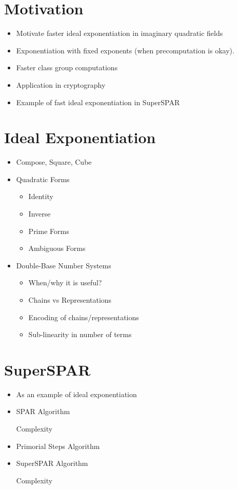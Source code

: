 \documentclass[11pt, letterpaper]{article}
\theoremstyle{definition}
\begin{document}
\section{Motivation}
\begin{itemize}
\item Motivate faster ideal exponentiation in imaginary quadratic fields
\item Exponentiation with fixed exponents (when precomputation is okay).
\item Faster class group computations
\item Application in cryptography
\item Example of fast ideal exponentiation in SuperSPAR
\end{itemize}


\section{Ideal Exponentiation}
\begin{itemize}
\item Compose, Square, Cube

\item Quadratic Forms
	\begin{itemize}
	\item Identity
	\item Inverse
	\item Prime Forms
	\item Ambiguous Forms
	\end{itemize}
	

\item Double-Base Number Systems
	\begin{itemize}
	\item When/why it is useful?
	\item Chains vs Representations
	\item Encoding of chains/representations
	\item Sub-linearity in number of terms
	\end{itemize}
	
	
\end{itemize}

\bigbreak
\section{SuperSPAR}
\begin{itemize}
\item As an example of ideal exponentiation
\item SPAR Algorithm
	\begin{itemize}
		Complexity
	\end{itemize}
\item Primorial Steps Algorithm
\item SuperSPAR Algorithm
	\begin{itemize}
		Complexity
	\end{itemize}
\end{itemize}
\end{document}
